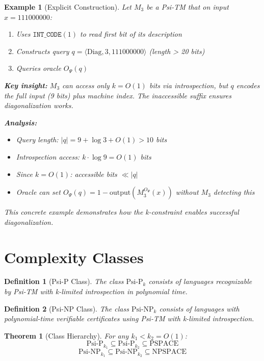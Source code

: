\documentclass[11pt]{article}
\newtheorem{theorem}{Theorem}
\newtheorem{definition}{Definition}
\newtheorem{example}{Example}
\begin{document}
\begin{example}[Explicit Construction]
\label{ex:concrete-diagonalization}
Let $M_3$ be a Psi-TM that on input $x = 111000000$:
\begin{enumerate}
\item Uses $\texttt{INT\_CODE}(1)$ to read first bit of its description
\item Constructs query $q = \langle \text{Diag}, 3, 111000000 \rangle$ (length > 20 bits)
\item Queries oracle $O_\Psi(q)$
\end{enumerate}

\textbf{Key insight:} $M_3$ can access only $k=O(1)$ bits via introspection, but $q$ encodes the full input (9 bits) plus machine index. The inaccessible suffix ensures diagonalization works.

\textbf{Analysis:}
\begin{itemize}
\item Query length: $|q| = 9 + \log 3 + O(1) > 10$ bits
\item Introspection access: $k \cdot \log 9 = O(1)$ bits
\item Since $k = O(1)$: accessible bits $\ll |q|$
\item Oracle can set $O_\Psi(q) = 1 - \text{output}(M_3^{O_\Psi}(x))$ without $M_3$ detecting this
\end{itemize}

This concrete example demonstrates how the k-constraint enables successful diagonalization.
\end{example}

\section{Complexity Classes}

\begin{definition}[Psi-P Class]
The class $\text{Psi-P}_k$ consists of languages recognizable by Psi-TM with k-limited introspection in polynomial time.
\end{definition}

\begin{definition}[Psi-NP Class]
The class $\text{Psi-NP}_k$ consists of languages with polynomial-time verifiable certificates using Psi-TM with k-limited introspection.
\end{definition}

\begin{theorem}[Class Hierarchy]
For any $k_1 < k_2 = O(1)$:
$$\text{Psi-P}_{k_1} \subseteq \text{Psi-P}_{k_2} \subseteq \text{PSPACE}$$
$$\text{Psi-NP}_{k_1} \subseteq \text{Psi-NP}_{k_2} \subseteq \text{NPSPACE}$$
\end{theorem}
\end{document}
